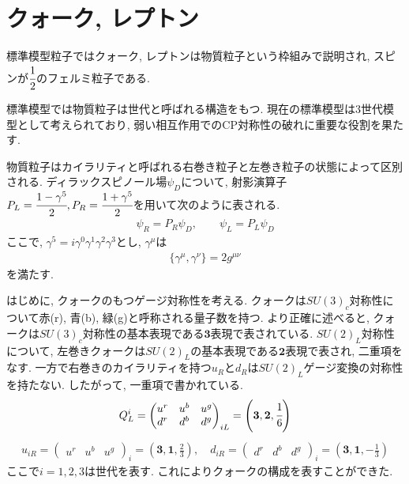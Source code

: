 \section{クォーク, レプトン}
標準模型粒子ではクォーク, レプトンは物質粒子という枠組みで説明され, スピンが$\cfrac{1}{2}$のフェルミ粒子である.

標準模型では物質粒子は世代と呼ばれる構造をもつ.
現在の標準模型は3世代模型として考えられており, 弱い相互作用でのCP対称性の破れに重要な役割を果たす.\cite{cabibbo_unitary_1963,kobayashi_cp-violation_1973}

物質粒子はカイラリティと呼ばれる右巻き粒子と左巻き粒子の状態によって区別される.
ディラックスピノール場$\psi_D$について, 射影演算子$P_L = \cfrac{1-\gamma^5}{2}, P_R= \cfrac{1+\gamma^5}{2}$を用いて次のように表される.
\begin{align}
  \psi_R = P_R \psi_D,\qquad \psi_L=P_L \psi_D
\end{align}
ここで, $\gamma^5= i\gamma^0 \gamma^1 \gamma^2 \gamma^3$とし, $\gamma^\mu$は
\begin{align}
  \{ \gamma^\mu, \gamma^\nu \} = 2g^{\mu\nu}
\end{align}
を満たす.

はじめに, クォークのもつゲージ対称性を考える.
クォークは$SU(3)_c$対称性について赤(r), 青(b), 緑(g)と呼称される量子数を持つ.
より正確に述べると, クォークは$SU(3)_c$対称性の基本表現である$\bm{3}$表現で表されている.
$SU(2)_L$対称性について, 左巻きクォークは$SU(2)_L$の基本表現である$\bm{2}$表現で表され, 二重項をなす.
一方で右巻きのカイラリティを持つ$u_R$と$d_R$は$SU(2)_L$ゲージ変換の対称性を持たない.
したがって, 一重項で書かれている.
\begin{align}
Q^i_L = \begin{pmatrix}
      u^r & u^b & u^g \\
      d^r & d^b & d^g
    \end{pmatrix}_{iL} = \left(\bm{3}, \bm{2}, \cfrac{1}{6}\right)
\end{align}
\begin{align}
  u_{iR} = \begin{pmatrix} 
    u^r & u^b & u^g
  \end{pmatrix}_i = \left(\bm{3} ,\bm{1}, \frac{2}{3}\right),\quad
  d_{iR} = \begin{pmatrix} 
    d^r & d^b & d^g
  \end{pmatrix}_i = \left(\bm{3} ,\bm{1}, -\frac{1}{3}\right)
\end{align}
ここで$i=1,2,3$は世代を表す.
これによりクォークの構成を表すことができた.

